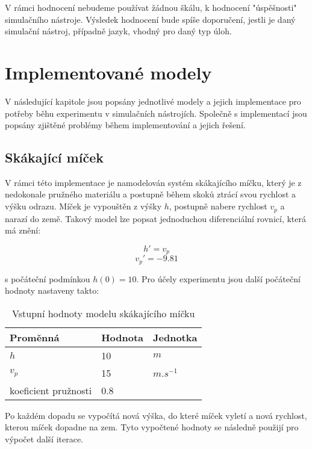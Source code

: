 V rámci hodnocení nebudeme používat žádnou škálu, k hodnocení "úspěšnosti" simulačního nástroje. Výsledek hodnocení bude spíše doporučení, jestli je daný simulační nástroj, případně jazyk, vhodný pro daný typ úloh.


\section{Implementované modely}
\label{implementace}
V následující kapitole jsou popsány jednotlivé modely a jejich implementace pro potřeby běhu experimentu v simulačních nástrojích. Společně s implementací jsou popsány zjištěné problémy během implementování a jejich řešení. 

\subsection{Skákající míček}
V rámci této implementace je namodelován systém skákajícího míčku, který je z nedokonale pružného materiálu a postupně během skoků ztrácí svou rychlost a výšku odrazu. Míček je vypouštěn z výšky $h$, postupně nabere rychlost $v_p$ a narazí do země. Takový model lze popsat jednoduchou diferenciální rovnicí, která má znění:

\begin{equation}
    h' = v_p
\end{equation}
\begin{equation}
    v_p ' = -9.81
\end{equation}

s počáteční podmínkou $h(0) = 10$. Pro účely experimentu jsou další počáteční hodnoty nastaveny takto:

\begin{center}
\begin{table}[ht]
    \centering
\begin{tabular}{|l|l|l|}
\hline
Proměnná             & Hodnota & Jednotka    \\ \hline
$h$                    &   10     & $m$     \\ \hline
$v_p$                   &    15   & $m.s^{-1}$ \\ \hline
koeficient pružnosti &  0.8    &             \\ \hline
\end{tabular}
    \caption{Vstupní hodnoty modelu skákajícího míčku}
    \label{tab:micek-hodnoty}
\end{table}
\end{center}

Po každém dopadu se vypočítá nová výška, do které míček vyletí a nová rychlost, kterou míček dopadne na zem. Tyto vypočtené hodnoty se následně použijí pro výpočet další iterace. 

